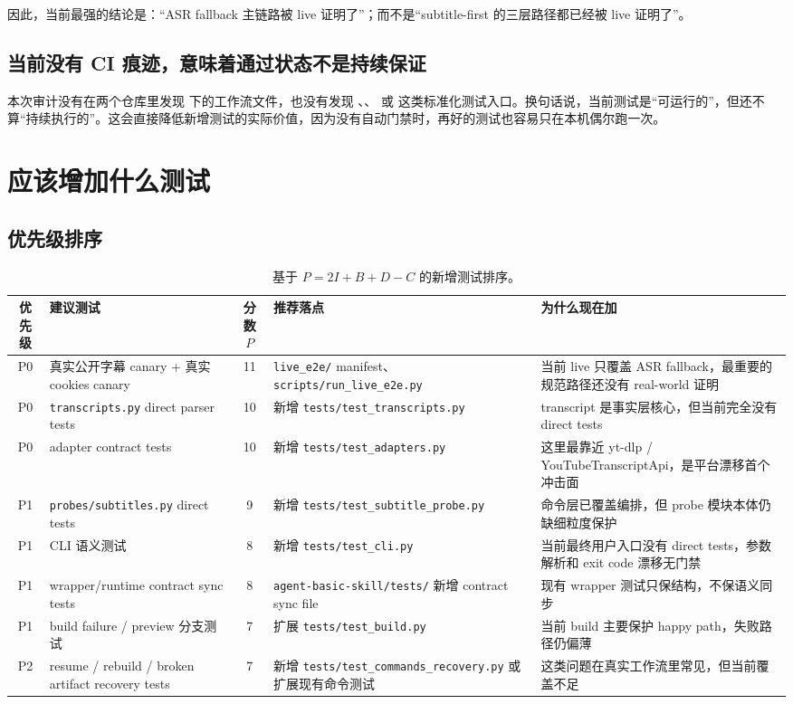 \documentclass[a4paper]{article}
\begin{document}
因此，当前最强的结论是：“ASR fallback 主链路被 live 证明了”；而不是“subtitle-first 的三层路径都已经被 live 证明了”。

\subsection{当前没有 CI 痕迹，意味着通过状态不是持续保证}

本次审计没有在两个仓库里发现  下的工作流文件，也没有发现 、、 或  这类标准化测试入口。换句话说，当前测试是“可运行的”，但还不算“持续执行的”。这会直接降低新增测试的实际价值，因为没有自动门禁时，再好的测试也容易只在本机偶尔跑一次。

\section{应该增加什么测试}

\subsection{优先级排序}

\begin{table}[H]
\centering
\small
\begin{tabularx}{\textwidth}{c>{\raggedright\arraybackslash}p{4.2cm}cYY}
\toprule
优先级 & 建议测试 & 分数 $P$ & 推荐落点 & 为什么现在加 \\
\midrule
P0 & 真实公开字幕 canary + 真实 cookies canary & 11 & \texttt{live\_e2e/} manifest、\texttt{scripts/run\_live\_e2e.py} & 当前 live 只覆盖 ASR fallback，最重要的规范路径还没有 real-world 证明 \\
P0 & \texttt{transcripts.py} direct parser tests & 10 & 新增 \texttt{tests/test\_transcripts.py} & transcript 是事实层核心，但当前完全没有 direct tests \\
P0 & adapter contract tests & 10 & 新增 \texttt{tests/test\_adapters.py} & 这里最靠近 yt-dlp / YouTubeTranscriptApi，是平台漂移首个冲击面 \\
P1 & \texttt{probes/subtitles.py} direct tests & 9 & 新增 \texttt{tests/test\_subtitle\_probe.py} & 命令层已覆盖编排，但 probe 模块本体仍缺细粒度保护 \\
P1 & CLI 语义测试 & 8 & 新增 \texttt{tests/test\_cli.py} & 当前最终用户入口没有 direct tests，参数解析和 exit code 漂移无门禁 \\
P1 & wrapper/runtime contract sync tests & 8 & \texttt{agent-basic-skill/tests/} 新增 contract sync file & 现有 wrapper 测试只保结构，不保语义同步 \\
P1 & build failure / preview 分支测试 & 7 & 扩展 \texttt{tests/test\_build.py} & 当前 build 主要保护 happy path，失败路径仍偏薄 \\
P2 & resume / rebuild / broken artifact recovery tests & 7 & 新增 \texttt{tests/test\_commands\_recovery.py} 或扩展现有命令测试 & 这类问题在真实工作流里常见，但当前覆盖不足 \\
\bottomrule
\end{tabularx}
\caption{基于 $P = 2I + B + D - C$ 的新增测试排序。}
\end{table}
\end{document}
